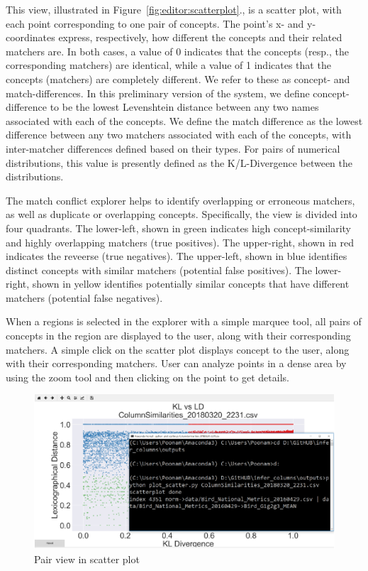 This view, illustrated in Figure~\ref{fig:editor:scatterplot}., is a scatter plot, with each point corresponding to one pair of concepts.
The point's x- and y-coordinates express, respectively, how different the concepts and their related matchers are.
In both cases, a value of 0 indicates that the concepts (resp., the corresponding matchers) are identical, while a value of 1 indicates that the concepts (matchers) are completely different.
We refer to these as concept- and match-differences.
In this preliminary version of the system, we define concept-difference to be the lowest Levenshtein distance between any two names associated with each of the concepts.
We define the match difference as the lowest difference between any two matchers associated with each of the concepts, with inter-matcher differences defined based on their types.
For pairs of numerical distributions, this value is presently defined as the K/L-Divergence between the distributions.

The match conflict explorer helps to identify overlapping or erroneous matchers, as well as duplicate or overlapping concepts.
Specifically, the view is divided into four quadrants.  The lower-left, shown in green indicates high concept-similarity and highly overlapping matchers (true positives).  
The upper-right, shown in red indicates the reveerse (true negatives).
The upper-left, shown in blue identifies distinct concepts with similar matchers (potential false positives).  
The lower-right, shown in yellow identifies potentially similar concepts that have different matchers (potential false negatives).

When a regions is selected in the explorer with a simple marquee tool, all pairs of concepts in the region are displayed to the user, along with their corresponding matchers.
A simple click on the scatter plot displays concept to the user, along with their corresponding matchers. User can analyze points in a dense area by using the zoom tool and then clicking on the point to get details.


\begin{figure}[H]
	\centering
	\includegraphics[width=0.8\columnwidth]{graphics/Pair_view}
	\caption{Pair view in scatter plot}
	\label{fig:Pair view}
\end{figure}


